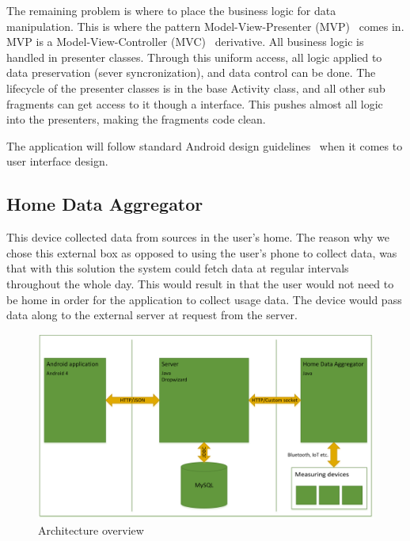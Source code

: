 The remaining problem is where to place the business logic for data manipulation. This is where the pattern Model-View-Presenter (MVP)~\cite{mvp} comes in. MVP is a Model-View-Controller (MVC)~\cite{mvc} derivative. All business logic is handled in presenter classes. Through this uniform access, all logic applied to data preservation (sever syncronization), and data control can be done. The lifecycle of the presenter classes is in the base Activity class, and all other sub fragments can get access to it though a interface. This pushes almost all logic into the presenters, making the fragments code clean.

The application will follow standard Android design guidelines~\cite{Androidgui}
when it comes to user interface design.

\subsection{Home Data Aggregator}
This device collected data from sources in the user's home. The reason why we chose this external box as opposed to using the user's phone to collect data, was that with this solution the system could fetch data at regular intervals throughout 
the whole day. This would result in that the user would not need to be home in order for the application to collect 
usage data. The device would pass data along to the external server at request from the server.

\begin{figure}[H]
\includegraphics[width=\textwidth]{ch/implementation/fig/architecture.png}
\caption{Architecture overview}
\end{figure}